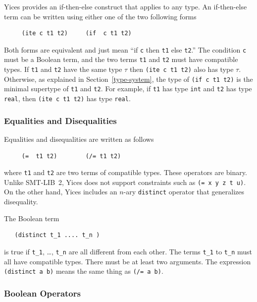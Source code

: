\documentclass[11pt,twoside,fleqn,openright,titlepage]{cslreport}
\begin{document}
Yices provides an if-then-else construct that applies to any type.  An
if-then-else term can be written using either one of the two following
forms
\begin{small}
\begin{verbatim}
     (ite c t1 t2)     (if  c t1 t2)
\end{verbatim}
\end{small}
Both forms are equivalent and just mean ``if \texttt{c} then
\texttt{t1} else \texttt{t2}.''  The condition \texttt{c} must
be a Boolean term, and the two terms \texttt{t1} and \texttt{t2}
must have compatible types. If \texttt{t1} and \texttt{t2} have
the same type $\tau$ then \texttt{(ite c t1 t2)} also has type
$\tau$.  Otherwise, as explained in Section~\ref{type-system}, the
type of \texttt{(if c t1 t2)} is the minimal supertype of
\texttt{t1} and \texttt{t2}.  For example, if \texttt{t1} has
type \texttt{int} and \texttt{t2} has type \texttt{real}, then
\texttt{(ite c t1 t2)} has type \texttt{real}.

\subsubsection*{Equalities and Disequalities}

Equalities and disequalities are written as follows
\begin{small}
\begin{verbatim}
     (=  t1 t2)        (/= t1 t2)
\end{verbatim}
\end{small}
where \texttt{t1} and \texttt{t2} are two terms of compatible
types. These operators are binary. Unlike SMT-LIB~2, Yices does not
support constraints such as \texttt{(= x y z t u)}. On the other hand,
Yices includes an $n$-ary \texttt{distinct} operator that generalizes
disequality.

\medskip\noindent
The Boolean term
\begin{small}
\begin{verbatim}
   (distinct t_1 .... t_n )
\end{verbatim}
\end{small}
is true if \texttt{t\_1}, \ldots, \texttt{t\_n} are all different
from each other. The terms \texttt{t\_1} to \texttt{t\_n} must all
have compatible types.  There must be at least two arguments. The
expression \texttt{(distinct a b)} means the same thing as \texttt{(/= a
  b)}.

\subsubsection*{Boolean Operators}
\end{document}
